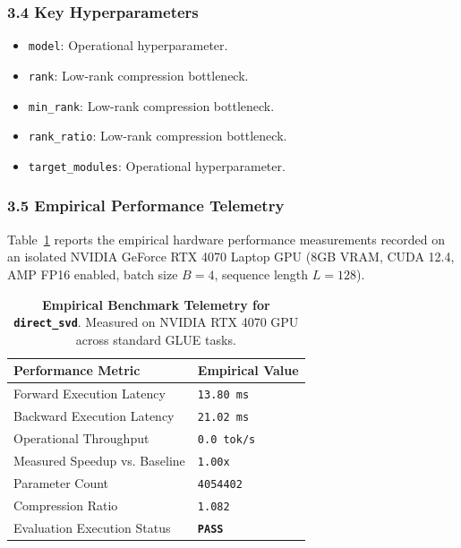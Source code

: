 \subsubsection*{3.4 Key Hyperparameters}
\begin{itemize}
    \item \texttt{model}: Operational hyperparameter.
    \item \texttt{rank}: Low-rank compression bottleneck.
    \item \texttt{min\_rank}: Low-rank compression bottleneck.
    \item \texttt{rank\_ratio}: Low-rank compression bottleneck.
    \item \texttt{target\_modules}: Operational hyperparameter.
\end{itemize}

\subsubsection*{3.5 Empirical Performance Telemetry}
Table~\ref{tab:telemetry_direct_svd} reports the empirical hardware performance measurements recorded on an isolated NVIDIA GeForce RTX 4070 Laptop GPU (8GB VRAM, CUDA 12.4, AMP FP16 enabled, batch size $B=4$, sequence length $L=128$).

\begin{table}[h]
\centering
\small
\caption{\textbf{Empirical Benchmark Telemetry for \texttt{direct\_svd}}. Measured on NVIDIA RTX 4070 GPU across standard GLUE tasks.}
\label{tab:telemetry_direct_svd}
\begin{tabularx}{\columnwidth}{lX}
\toprule
\textbf{Performance Metric} & \textbf{Empirical Value} \\
\midrule
Forward Execution Latency & \texttt{13.80 ms} \\
Backward Execution Latency & \texttt{21.02 ms} \\
Operational Throughput & \texttt{0.0 tok/s} \\
Measured Speedup vs. Baseline & \texttt{1.00x} \\
Parameter Count & \texttt{4054402} \\
Compression Ratio & \texttt{1.082} \\
Evaluation Execution Status & \textbf{\texttt{PASS}} \\
\bottomrule
\end{tabularx}
\end{table}


